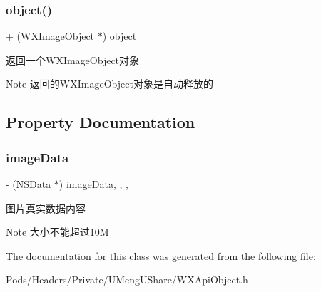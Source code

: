 \subsubsection{\texorpdfstring{object()}{object()}\hspace{0.1cm}{\footnotesize\ttfamily [3/3]}}
{\footnotesize\ttfamily + (\mbox{\hyperlink{interface_w_x_image_object}{W\+X\+Image\+Object}} $\ast$) object \begin{DoxyParamCaption}{ }\end{DoxyParamCaption}}



返回一个\+W\+X\+Image\+Object对象 

\begin{DoxyNote}{Note}
返回的\+W\+X\+Image\+Object对象是自动释放的 
\end{DoxyNote}


\subsection{Property Documentation}
\mbox{\label{interface_w_x_image_object_a65a8cae09a593c4b96a97788cd8adf52}} 
\subsubsection{\texorpdfstring{image\+Data}{imageData}}
{\footnotesize\ttfamily -\/ (N\+S\+Data $\ast$) image\+Data\hspace{0.3cm}{\ttfamily [read]}, {\ttfamily [write]}, {\ttfamily [nonatomic]}, {\ttfamily [retain]}}

图片真实数据内容 \begin{DoxyNote}{Note}
大小不能超过10M 
\end{DoxyNote}


The documentation for this class was generated from the following file\+:\begin{DoxyCompactItemize}
\item 
Pods/\+Headers/\+Private/\+U\+Meng\+U\+Share/W\+X\+Api\+Object.\+h\end{DoxyCompactItemize}
